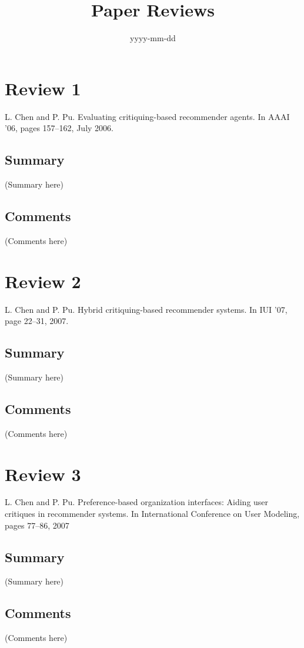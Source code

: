 \documentclass{article}
\begin{document}
\title{Paper Reviews}
\date{yyyy-mm-dd}
\maketitle

\section*{Review 1}
L. Chen and P. Pu. Evaluating critiquing-based recommender agents. 
In AAAI ’06, pages 157–162, July 2006.

\subsection*{Summary}
(Summary here)

\subsection*{Comments}
(Comments here)

\section*{Review 2}
L. Chen and P. Pu. Hybrid critiquing-based recommender systems. 
In IUI ’07, page 22–31, 2007.

\subsection*{Summary}
(Summary here)

\subsection*{Comments}
(Comments here)

\section*{Review 3}
L. Chen and P. Pu. Preference-based organization interfaces: Aiding user 
critiques in recommender systems. In International Conference on 
User Modeling, pages 77–86, 2007

\subsection*{Summary}
(Summary here)

\subsection*{Comments}
(Comments here)
\end{document}
